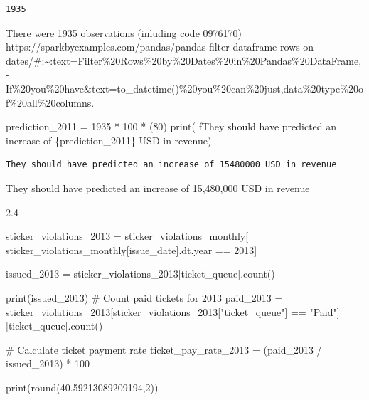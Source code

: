 \documentclass[
  letterpaper,
  DIV=11,
  numbers=noendperiod]{scrartcl}
\newenvironment{Shaded}{\begin{snugshade}}{\end{snugshade}}
\newcommand{\BuiltInTok}[1]{\textcolor[rgb]{0.00,0.23,0.31}{#1}}
\newcommand{\CommentTok}[1]{\textcolor[rgb]{0.37,0.37,0.37}{#1}}
\newcommand{\DecValTok}[1]{\textcolor[rgb]{0.68,0.00,0.00}{#1}}
\newcommand{\FloatTok}[1]{\textcolor[rgb]{0.68,0.00,0.00}{#1}}
\newcommand{\NormalTok}[1]{\textcolor[rgb]{0.00,0.23,0.31}{#1}}
\newcommand{\OperatorTok}[1]{\textcolor[rgb]{0.37,0.37,0.37}{#1}}
\newcommand{\SpecialCharTok}[1]{\textcolor[rgb]{0.37,0.37,0.37}{#1}}
\newcommand{\SpecialStringTok}[1]{\textcolor[rgb]{0.13,0.47,0.30}{#1}}
\newcommand{\StringTok}[1]{\textcolor[rgb]{0.13,0.47,0.30}{#1}}
\begin{document}
\begin{verbatim}
1935
\end{verbatim}

There were 1935 observations (inluding code 0976170)
https://sparkbyexamples.com/pandas/pandas-filter-dataframe-rows-on-dates/\#:\textasciitilde:text=Filter\%20Rows\%20by\%20Dates\%20in\%20Pandas\%20DataFrame,-If\%20you\%20have\&text=to\_datetime()\%20you\%20can\%20just,data\%20type\%20of\%20all\%20columns.

\begin{Shaded}
\begin{Highlighting}[]
\NormalTok{prediction\_2011 }\OperatorTok{=} \DecValTok{1935} \OperatorTok{*} \DecValTok{100} \OperatorTok{*}\NormalTok{ (}\DecValTok{80}\NormalTok{)}
\BuiltInTok{print}\NormalTok{(}
    \SpecialStringTok{f\textquotesingle{}They should have predicted an increase of }\SpecialCharTok{\{}\NormalTok{prediction\_2011}\SpecialCharTok{\}}\SpecialStringTok{ USD in revenue\textquotesingle{}}\NormalTok{)}
\end{Highlighting}
\end{Shaded}

\begin{verbatim}
They should have predicted an increase of 15480000 USD in revenue
\end{verbatim}

They should have predicted an increase of 15,480,000 USD in revenue

2.4

\begin{Shaded}
\begin{Highlighting}[]
\NormalTok{sticker\_violations\_2013 }\OperatorTok{=}\NormalTok{ sticker\_violations\_monthly[}
\NormalTok{    sticker\_violations\_monthly[}\StringTok{\textquotesingle{}issue\_date\textquotesingle{}}\NormalTok{].dt.year }\OperatorTok{==} \DecValTok{2013}\NormalTok{]}

\NormalTok{issued\_2013 }\OperatorTok{=}\NormalTok{ sticker\_violations\_2013[}\StringTok{\textquotesingle{}ticket\_queue\textquotesingle{}}\NormalTok{].count()}

\BuiltInTok{print}\NormalTok{(issued\_2013)}
\CommentTok{\# Count paid tickets for 2013}
\NormalTok{paid\_2013 }\OperatorTok{=}\NormalTok{ sticker\_violations\_2013[sticker\_violations\_2013[}\StringTok{"ticket\_queue"}\NormalTok{]}
                                    \OperatorTok{==} \StringTok{"Paid"}\NormalTok{][}\StringTok{\textquotesingle{}ticket\_queue\textquotesingle{}}\NormalTok{].count()}

\CommentTok{\# Calculate ticket payment rate}
\NormalTok{ticket\_pay\_rate\_2013 }\OperatorTok{=}\NormalTok{ (paid\_2013 }\OperatorTok{/}\NormalTok{ issued\_2013) }\OperatorTok{*} \DecValTok{100}


\BuiltInTok{print}\NormalTok{(}\BuiltInTok{round}\NormalTok{(}\FloatTok{40.59213089209194}\NormalTok{,}\DecValTok{2}\NormalTok{))}
\end{Highlighting}
\end{Shaded}
\end{document}
